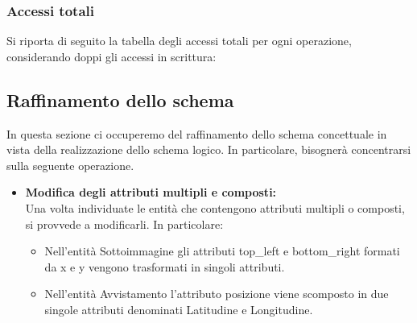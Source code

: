 \documentclass[a4paper,final,12pt]{report}
\begin{document}
\subsubsection{Accessi totali}
Si riporta di seguito la tabella degli accessi totali per ogni operazione, considerando doppi gli accessi in scrittura:
\begin{table}[hbtp]
\centering
{}
\end{table}

\subsection{Raffinamento dello schema}
In questa sezione ci occuperemo del raffinamento dello schema concettuale in vista della realizzazione dello schema logico. In particolare, bisognerà concentrarsi sulla seguente operazione.

\begin{itemize}
\item \textbf{Modifica degli attributi multipli e composti:}\\
Una volta individuate le entità che contengono attributi multipli o composti, si provvede a modificarli. In particolare: \\ 
\begin{itemize}
\item Nell'entità Sottoimmagine gli attributi top\_left e bottom\_right formati da x e y vengono trasformati in singoli attributi.
\item Nell'entità Avvistamento l'attributo posizione viene scomposto in due singole attributi denominati Latitudine e Longitudine. 
\end{itemize}
\end{itemize}
\end{document}
